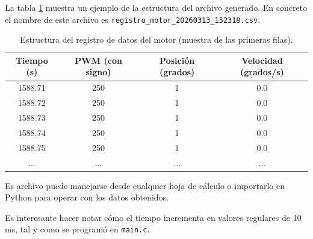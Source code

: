 \documentclass[10pt,a4paper]{report}
\begin{document}
La tabla \ref{tab:csv} muestra un ejemplo de la estructura del archivo generado. En concreto el nombre de este archivo es \texttt{registro\_motor\_20260313\_152318.csv}.

\begin{table}[h]
    \centering
    \begin{tabular}{|c|c|c|c|}
        \hline
        \textbf{Tiempo (s)} & \textbf{PWM (con signo)} & \textbf{Posición (grados)} & \textbf{Velocidad (grados/s)} \\
        \hline
        1588.71 & 250 & 1 & 0.0 \\
        1588.72 & 250 & 1 & 0.0 \\
        1588.73 & 250 & 1 & 0.0 \\
        1588.74 & 250 & 1 & 0.0 \\
        1588.75 & 250 & 1 & 0.0 \\
        ... & ... & ... & ... \\
        \hline
    \end{tabular}
    \caption{Estructura del registro de datos del motor (muestra de las primeras filas).}
    \label{tab:csv}
\end{table}

Es archivo puede manejarse desde cualquier hoja de cálculo o importarlo en Python para operar con los datos obtenidos.

Es interesante hacer notar cómo el tiempo incrementa en valores regulares de 10 ms, tal y como se programó en \texttt{main.c}.
\end{document}
